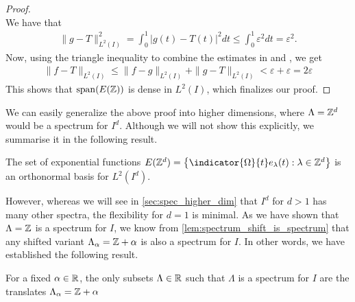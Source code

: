 \documentclass[../thesis.tex]{subfiles}
\begin{document}
\begin{proof}
\begin{equation*}
    \end{equation*}
    We have that
    \begin{align}\label{eq:estimate_2}
        \| g-T \|_{L^2(I)}^2 = \int_0^1 \left|g(t)-T(t) \right|^2dt \leq \int_0^1 \varepsilon^2 dt = \varepsilon^2.
    \end{align}
    Now, using the triangle inequality to combine the estimates in  and , we get
    \begin{align*}
        \| f-T\|_{L^2(I)} \leq  \| f-g\|_{L^2(I)} +\| g-T\|_{L^2(I)} < \varepsilon + \varepsilon =  2 \varepsilon
    \end{align*}
    This shows that $\operatorname{span}(E(\mathbb{Z}))$ is dense in $L^2(I)$, which finalizes our proof.
\end{proof}


We can easily generalize the above proof into higher dimensions, where $\Lambda = \mathbb{Z}^d$ would be a spectrum for $I^d$. Although we will not show this explicitly, we summarise it in the following result.

\begin{lemma}\label{lem:z_d_in_higer_d}
    The set of exponential functions $E(\Z^d) = \braqMed{\indicator{\Omega}{t} e_\lambda(t) : \lambda \in \Z^d}$ is an orthonormal basis for $L^2(I^d)$.
\end{lemma}

However, whereas we will see in \cref{sec:spec_higher_dim} that $I^d$ for $d>1$ has many other spectra, the flexibility for $d=1$ is minimal. As we have shown that $\Lambda = \mathbb{Z}$ is a spectrum for $I$, we know from \cref{lem:spectrum_shift_is_spectrum} that any shifted variant $\Lambda_\alpha = \mathbb{Z} + \alpha$ is also a spectrum for $I$. In other words, we have established the following result.
\begin{proposition}
    For a fixed $\alpha \in \mathbb{R}$, the only subsets $\Lambda \in \mathbb{R}$ such that $\Lambda$ is a spectrum for $I$ are the translates $\Lambda_\alpha = \mathbb{Z} + \alpha$
\end{proposition}
\end{document}
